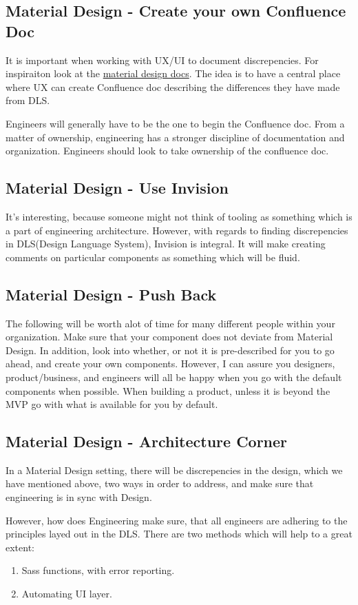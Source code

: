 \subsection{ Material Design - Create your own Confluence Doc }

It is important when working with UX/UI to document discrepencies. For
inspiraiton look at the \href{https://material.io/guidelines/components/sliders.html}{material design docs}.
The idea is to have a central place where UX can create Confluence doc
describing the differences they have made from DLS.

Engineers will generally have to be the one to begin the Confluence doc. From a
matter of ownership, engineering has a stronger discipline of documentation and
organization. Engineers should look to take ownership of the confluence doc.

\subsection{ Material Design - Use Invision }
It's interesting, because someone might not think of tooling as something which
is a part of engineering architecture. However, with regards to finding
discrepencies in DLS(Design Language System), Invision is integral. It will
make creating comments on particular components as something which will be fluid.

\subsection{ Material Design - Push Back }
The following will be worth alot of time for many different people within your
organization. Make sure that your component does not deviate from Material
Design. In addition, look into whether, or not it is pre-described for you to
go ahead, and create your own components. However, I can assure you designers,
product/business, and engineers will all be happy when you go with the default
components when possible. When building a product, unless it is beyond the MVP
go with what is available for you by default.

\subsection{ Material Design - Architecture Corner }
In a Material Design setting, there will be discrepencies in the design, which
we have mentioned above, two ways in order to address, and make sure that
engineering is in sync with Design.

However, how does Engineering make sure, that all engineers are adhering to the
principles layed out in the DLS. There are two methods which will help to a
great extent:
\begin{enumerate}
  \item Sass functions, with error reporting.
  \item Automating UI layer.
\end{enumerate}
